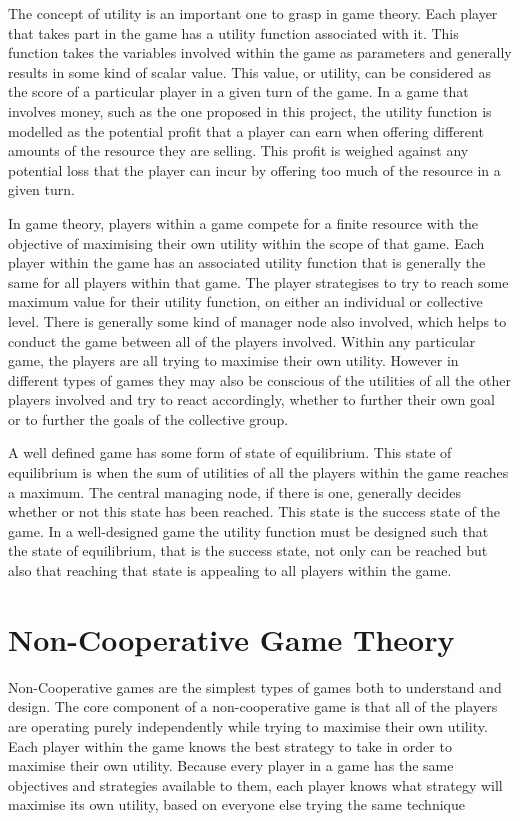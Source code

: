\documentclass[a4paper, notitlepage]{report}
\begin{document}
The concept of utility is an important one to grasp in game theory. Each player
that takes part in the game has a utility function associated with it. This
function takes the variables involved within the game as parameters and
generally results in some kind of scalar value. This value, or utility, can be
considered as the score of a particular player in a given turn of the game. In a
game that involves money, such as the one proposed in this project, the utility
function is modelled as the potential profit that a player can earn when offering
different amounts of the resource they are selling. This profit is weighed
against any potential loss that the player can incur by offering too much of the
resource in a given turn.

In game theory, players within a game compete for a finite resource with the
objective of maximising their own utility within the scope of that game. Each
player within the game has an associated utility function that is generally the
same for all players within that game. The player strategises to try to reach
some maximum value for their utility function, on either an
individual or collective level. There is generally some kind of manager node
also involved, which helps to conduct the game between all of the players
involved. Within any particular game, the players are all trying to maximise
their own utility. However in different types of games they may also be
conscious of the utilities of all the other players involved and try to react
accordingly, whether to further their own goal or to further the goals of the
collective group.

A well defined game has some form of state of equilibrium. This state of
equilibrium is when the sum of utilities of all the players within the game
reaches a maximum. The central managing node, if there is one, generally decides
whether or not this state has been reached. This state is the success state of
the game. In a well-designed game the utility function must be designed such
that the state of equilibrium, that is the success state, not only can be
reached but also that reaching that state is appealing to all players within the
game.
\section{Non-Cooperative Game Theory}
\label{sec:orgefcba70}
Non-Cooperative games are the simplest types of games both to understand and
design. The core component of a non-cooperative game is that all of the players
are operating purely independently while trying to maximise their own utility.
Each player within the game knows the best strategy to take in order to maximise
their own utility. Because every player in a game has the same objectives and
strategies available to them, each player knows what strategy will maximise its
own utility, based on everyone else trying the same technique
\end{document}
